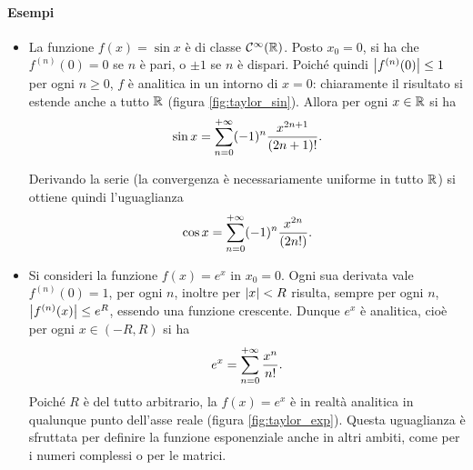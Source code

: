 \paragraph{Esempi}
\begin{itemize}
\item La funzione $f(x)=\sin x$ è di classe $\mathcal{C}^{{\infty}}(\mathbb{R})$. Posto $x_0=0$, si ha che $f^{(n)}(0)=0$ se $n$ è pari, o $\pm 1$ se $n$ è dispari. Poiché quindi $\left|{f^{(n)}(0)}\right|\leq 1$ per ogni $n\geq 0$, $f$ è analitica in un intorno di $x=0$: chiaramente il risultato si estende anche a tutto $\mathbb{R}$ (figura \ref{fig:taylor_sin}).
Allora per ogni $x\in\mathbb{R}$ si ha
\[
\sin x=\sum_{n=0}^{+\infty}(-1)^n\frac{x^{2n+1}}{(2n+1)!}.
\]

Derivando la serie (la convergenza è necessariamente uniforme in tutto $\mathbb{R}$) si ottiene quindi l'uguaglianza
\[
\cos x=\sum_{n=0}^{+\infty}(-1)^n\frac{x^{2n}}{(2n!)}.
\]
\item Si consideri la funzione $f(x)=e^x$ in $x_0=0$. Ogni sua derivata vale $f^{(n)}(0)=1$, per ogni $n$, inoltre per $\left|{x}\right|<R$ risulta, sempre per ogni $n$, $\left|{f^{(n)}(x)}\right|\leq e^R$, essendo una funzione crescente. Dunque $e^x$ è analitica, cioè per ogni $x\in(-R,R)$ si ha
\[
e^x=\sum_{n=0}^{+\infty}\frac{x^n}{n!}.
\]
Poiché $R$ è del tutto arbitrario, la $f(x)=e^x$ è in realtà analitica in qualunque punto dell'asse reale (figura \ref{fig:taylor_exp}).
Questa uguaglianza è sfruttata per definire la funzione esponenziale anche in altri ambiti, come per i numeri complessi o per le matrici.
\end{itemize}

